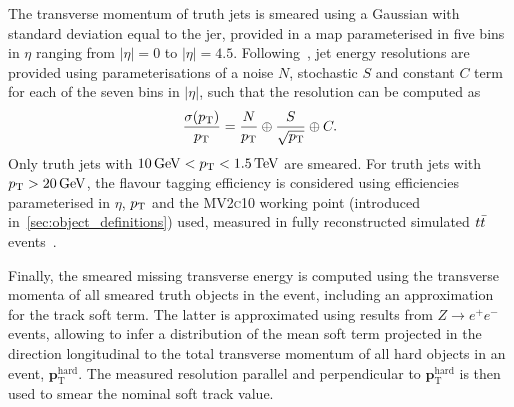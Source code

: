 The transverse momentum of truth jets is smeared using a Gaussian with standard deviation equal to the \gls{jer}, provided in a map parameterised in five bins in $\eta$ ranging from $\vert\eta\vert = 0$ to $\vert\eta\vert = 4.5$. Following~\cite{Aad:2020flx}, jet energy resolutions are provided using parameterisations of a noise $N$, stochastic $S$ and constant $C$ term for each of the seven bins in $\vert\eta\vert$, such that the resolution can be computed as
\begin{equation}
	\frac{\sigma(p_{\textrm{T}})}{p_{\textrm{T}}} = \frac{N}{p_{\textrm{T}}}\oplus\frac{S}{\sqrt{p_{\textrm{T}}}}\oplus C.
\end{equation}
Only truth jets with $\SI{10}{\GeV} < \pt < \SI{1.5}{\TeV}$ are smeared. For truth jets with $\pt > \SI{20}{\GeV}$, the flavour tagging efficiency is considered using efficiencies parameterised in $\eta$, $p_{\textrm{T}}$ and the \textsc{MV2c10} working point (introduced in~\cref{sec:object_definitions}) used, measured in fully reconstructed simulated $t\bar{t}$ events~\cite{FTAG-2018-01}.

Finally, the smeared missing transverse energy is computed using the transverse momenta of all smeared truth objects in the event, including an approximation for the track soft term. The latter is approximated using results from $Z\rightarrow e^+e^-$ events, allowing to infer a distribution of the mean soft term projected in the direction longitudinal to the total transverse momentum of all hard objects in an event, $\boldsymbol{p}_\mathrm{T}^\mathrm{hard}$. The measured resolution parallel and perpendicular to $\boldsymbol{p}_\mathrm{T}^\mathrm{hard}$ is then used to smear the nominal soft track value.
 
